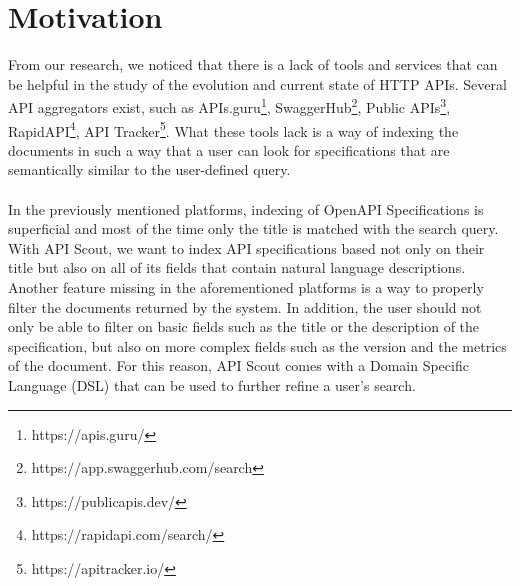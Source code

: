 \section{Motivation}\label{sec:motivation}
From our research, we noticed that there is a lack of tools and services that can be helpful in the study of the evolution and current state of HTTP APIs.
Several API aggregators exist, such as APIs.guru\footnote{https://apis.guru/}, SwaggerHub\footnote{https://app.swaggerhub.com/search}, Public APIs\footnote{https://publicapis.dev/}, RapidAPI\footnote{https://rapidapi.com/search/}, API Tracker\footnote{https://apitracker.io/}.
What these tools lack is a way of indexing the documents in such a way that a user can look for specifications that are semantically similar to the user-defined query. \\ \\
In the previously mentioned platforms, indexing of OpenAPI Specifications is superficial and most of the time only the title is matched with the search query.
With API Scout, we want to index API specifications based not only on their title but also on all of its fields that contain natural language descriptions.
Another feature missing in the aforementioned platforms is a way to properly filter the documents returned by the system.
In addition, the user should not only be able to filter on basic fields such as the title or the description of the specification, but also on more complex fields such as the version and the metrics of the document.
For this reason, API Scout comes with a Domain Specific Language (DSL) that can be used to further refine a user's search.
